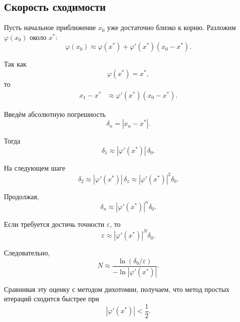 \documentclass[../final.tex]{subfiles}
\begin{document}
\subsection{Скорость сходимости}

Пусть начальное приближение $x_0$ уже достаточно близко к корню.
Разложим $\varphi(x_0)$ около $x^*$:
%
\begin{equation*}
    \varphi(x_0)
    \approx
    \varphi(x^*)
    +
    \varphi'(x^*)(x_0-x^*).
\end{equation*}

Так как
%
\begin{equation*}
    \varphi(x^*)=x^*,
\end{equation*}
%
то
%
\begin{align*}
    x_1-x^*
    &\approx
    \varphi'(x^*)(x_0-x^*).
\end{align*}

Введём абсолютную погрешность
%
\begin{equation*}
    \delta_n=|x_n-x^*|.
\end{equation*}

Тогда
%
\begin{equation*}
    \delta_1
    \approx
    |\varphi'(x^*)|\,\delta_0.
\end{equation*}

На следующем шаге
%
\begin{equation*}
    \delta_2
    \approx
    |\varphi'(x^*)|\,\delta_1
    \approx
    |\varphi'(x^*)|^2\delta_0.
\end{equation*}

Продолжая,
%
\begin{equation*}
    \delta_n
    \approx
    |\varphi'(x^*)|^n\delta_0.
\end{equation*}

Если требуется достичь точности $\varepsilon$, то
%
\begin{equation*}
    \varepsilon
    \approx
    |\varphi'(x^*)|^N\delta_0.
\end{equation*}

Следовательно,
%
\begin{equation*}
    N
    \approx
    \frac{\ln(\delta_0/\varepsilon)}
    {-\ln|\varphi'(x^*)|}.
\end{equation*}

Сравнивая эту оценку с методом дихотомии, получаем, что метод
простых итераций сходится быстрее при
%
\begin{equation*}
    |\varphi'(x^*)|<\frac12.
\end{equation*}
\end{document}
